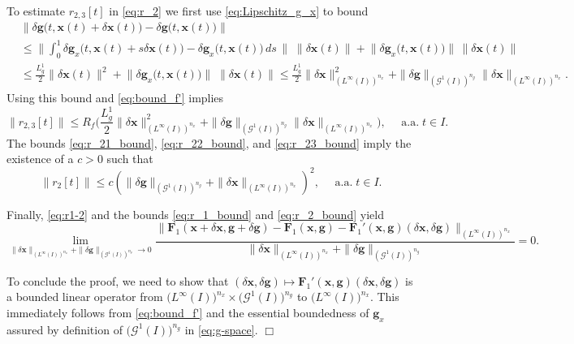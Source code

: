 \documentclass[onefignum,onetabnum]{siamart220329}
\numberwithin{equation}{section}
\newcommand{\aall}{\mbox{ a.a.} \;}
\newcommand{\bg}{\ensuremath{\mathbf{g}}} %
\newcommand{\bx}{\ensuremath{\mathbf{x}}} %
\newcommand{\BF}{\ensuremath{\mathbf{F}} } %
\newcommand {\cG} {\mathcal{G}}
\newcommand{\LL}{\big(L^\infty(I) \big)^{n_x}}
\begin{document}
\begin{appendix}
\begin{equation}
     \end{equation}
     To estimate  $r_{2, 3}[t]$ in \cref{eq:r_2} we first use \cref{eq:Lipschitz_g_x} to bound
     \begin{align*}
  & \big\|  \delta \bg\big( t,  \bx(t) + \delta \bx(t) \big)  - \delta \bg\big( t,   \bx(t) \big) \big\|      \nonumber \\
  & \le \Big\|  \int_0^1  \delta \bg_x\big( t,   \bx(t) + s \delta \bx(t)\big) - \delta \bg_x\big( t,   \bx(t)\big) \, ds \, \Big\|  \; \big\|  \delta \bx(t) \big\| 
	     + \big\|  \delta \bg_x \big(  t,   \bx(t) \big) \big\|  \, \big\|  \delta \bx(t) \big\|      \nonumber \\
	  & \le \frac{L_g^1}{2}   \| \delta \bx(t) \|^2  + \big\| \delta \bg_x \big(  t,  \bx(t) \big) \big\| \; \| \delta \bx(t) \|  
	     \le \frac{L_g^1}{2}   \| \delta \bx \|_{(L^\infty(I))^{n_x}}^2  + \| \delta \bg \|_{(\cG^1(I))^{n_g}}  \| \delta \bx \|_{(L^\infty(I))^{n_x}}.    
     \end{align*}
     Using this bound and \cref{eq:bound_f'} implies
     \begin{equation}  \label{eq:r_23_bound}
     	\big\| r_{2, 3}[t] \big\| 
	\leq R_f \Big( \frac{L_g^1}{2}   \| \delta \bx \|_{(L^\infty(I))^{n_x}}^2  + \| \delta \bg \|_{(\cG^1(I))^{n_g}}  \| \delta \bx \|_{(L^\infty(I))^{n_x}}\Big), \quad \aall t \in I.
    \end{equation}
    The bounds \cref{eq:r_21_bound}, \cref{eq:r_22_bound}, and \cref{eq:r_23_bound} imply the existence of a $c>0$ such that
     \begin{equation} \label{eq:r_2_bound}
     	\big\| r_2[t] \big\| \leq  c (  \| \delta \bg \|_{(\cG^1(I))^{n_g}} +  \| \delta \bx \|_{(L^\infty(I))^{n_x}})^2, \quad \aall t \in I.
     \end{equation}
     
     Finally, \cref{eq:r1-2} and the bounds \cref{eq:r_1_bound} and \cref{eq:r_2_bound} yield
    \[
           \lim_{ \| \delta \bx \|_{(L^\infty(I))^{n_x}}+ \| \delta \bg \|_{(\cG^1(I))^{n_g}} \rightarrow 0 }
            \frac{\| \BF_1(\bx + \delta \bx, \bg + \delta \bg) - \BF_1(\bx, \bg) - \BF_1'(\bx, \bg) (\delta \bx, \delta \bg) \|_{(L^\infty(I))^{n_x}}}
                    {\| \delta \bx \|_{(L^\infty(I))^{n_x}}+ \| \delta \bg \|_{(\cG^1(I))^{n_g}}} 
       = 0.
     \]
     
     To conclude the proof, we need to show that $(\delta \bx, \delta \bg) \mapsto \BF_1'(\bx, \bg) (\delta \bx, \delta \bg)$
     is a bounded linear operator from $\big(L^\infty(I)\big)^{n_x} \times \big(\cG^1(I)\big)^{n_g}$ to $ \LL$.
     This immediately follows from \cref{eq:bound_f'} and the essential boundedness of $\bg_x$ assured by definition of $\big(\cG^1(I)\big)^{n_g}$ in \cref{eq:g-space}.
\hfill $\Box$
 




\end{appendix}
\end{document}
